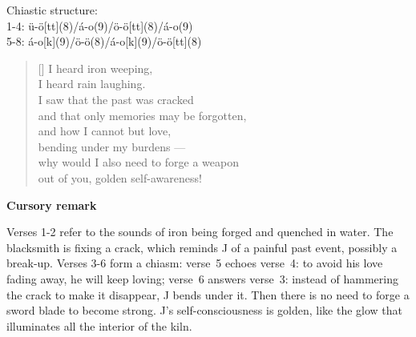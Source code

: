 \documentclass[a4paper,12pt,twoside,final]{book}
\begin{document}
\noindent Chiastic structure: \\
1-4: ü-ö[tt](8)/á-o(9)/ö-ö[tt](8)/á-o(9) \\
5-8: á-o[k](9)/ö-ö(8)/á-o[k](9)/ö-ö[tt](8)

\newpage


\settowidth{\versewidth}{and that only a memory can be forgotten;}

\begin{verse}[\versewidth]
  I heard iron weeping, \\
  I heard rain laughing. \\
  I saw that the past was cracked \\
  and that only memories may be forgotten, \\
  and how I cannot but love, \\
  bending under my burdens --- \\
  why would I also need to forge a weapon \\
  out of you, golden self-awareness! \\
\end{verse}


\bigskip

\noindent \textbf{Cursory remark}

\medskip

Verses 1-2 refer to the sounds of iron being forged and quenched in
water. The blacksmith is fixing a crack, which reminds J of a painful
past event, possibly a break\hyp{}up. Verses 3-6 form a chiasm:
verse~5 echoes verse~4: to avoid his love fading away, he will keep
loving; verse~6 answers verse~3: instead of hammering the crack to
make it disappear, J bends under it. Then there is no need to forge a
sword blade to become strong. J's self\hyp{}consciousness is golden,
like the glow that illuminates all the interior of the kiln.

\newpage

\settowidth{\versewidth}{s hogy nem tudok mást, mint szeretni,}
\end{document}
